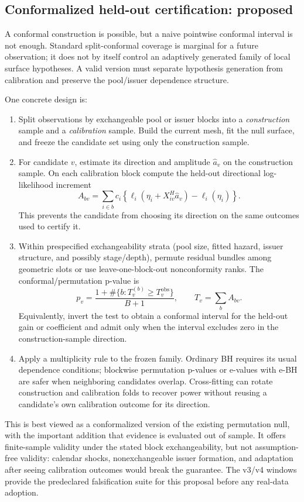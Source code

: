 \documentclass[11pt]{article}
\begin{document}
\subsection*{Conformalized held-out certification: proposed}
A conformal construction is possible, but a naive pointwise conformal interval is not enough. Standard
split-conformal coverage is marginal for a future observation; it does not by itself control an
adaptively generated family of local surface hypotheses. A valid version must separate hypothesis
generation from calibration and preserve the pool/issuer dependence structure.

One concrete design is:
\begin{enumerate}[leftmargin=2em,itemsep=2pt]
\item Split observations by exchangeable pool or issuer blocks into a \emph{construction} sample and
a \emph{calibration} sample. Build the current mesh, fit the null surface, and freeze the candidate
set using only the construction sample.
\item For candidate $v$, estimate its direction and amplitude $\hat a_v$ on the construction sample.
On each calibration block compute the held-out directional log-likelihood increment
\[
A_{bv}=\sum_{i\in b}c_i\left\{\ell_i(\eta_i+X^H_{iv}\hat a_v)-\ell_i(\eta_i)\right\}.
\]
This prevents the candidate from choosing its direction on the same outcomes used to certify it.
\item Within prespecified exchangeability strata (pool size, fitted hazard, issuer structure, and
possibly stage/depth), permute residual bundles among geometric slots or use leave-one-block-out
nonconformity ranks. The conformal/permutation p-value is
\[
p_v=\frac{1+\#\{b:T^{(b)}_v\ge T^{\mathrm{obs}}_v\}}{B+1},
\qquad T_v=\sum_b A_{bv}.
\]
Equivalently, invert the test to obtain a conformal interval for the held-out gain or coefficient and
admit only when the interval excludes zero in the construction-sample direction.
\item Apply a multiplicity rule to the frozen family. Ordinary BH requires its usual dependence
conditions; blockwise permutation p-values or e-values with e-BH are safer when neighboring
candidates overlap. Cross-fitting can rotate construction and calibration folds to recover power
without reusing a candidate's own calibration outcome for its direction.
\end{enumerate}

This is best viewed as a conformalized version of the existing permutation null, with the important
addition that evidence is evaluated out of sample. It offers finite-sample validity under the stated
block exchangeability, but not assumption-free validity: calendar shocks, nonexchangeable issuer
formation, and adaptation after seeing calibration outcomes would break the guarantee. The v3/v4
windows provide the predeclared falsification suite for this proposal before any real-data adoption.
\end{document}
